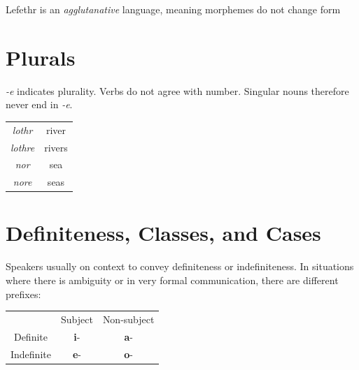 \documentclass[letterpaper,twocolumn,openany,nodeprecatedcode,hidelinks]{dndbook}
\begin{document}


\twocolumn



Lefethr is an \textit{agglutanative} language, meaning morphemes do not change form


\section*{Plurals}
\textit{-e} indicates plurality. Verbs do not agree with number. Singular nouns therefore never end in \textit{-e}.

\begin{center}
\begin{tabular}{|c c|}
     \hline

    \textit{lothr} &  river \\
     \textit{lothre} & rivers \\

     \hline
     \hline

     \textit{nor} & sea \\

     \textit{nore} & seas \\
     \hline

\end{tabular}
\end{center}





\section*{Definiteness, Classes, and Cases}

Speakers usually on context to convey definiteness or indefiniteness.
In situations where there is ambiguity or in very formal communication, there are different prefixes:

\begin{table}[H]
    \centering
    \begin{tabular}{ccc}
         &  Subject& Non-subject\\
         Definite&  \textbf{i}-& \textbf{a}-\\
         Indefinite&  \textbf{e}-& \textbf{o}-\\
    \end{tabular}
\end{table}
\end{document}
